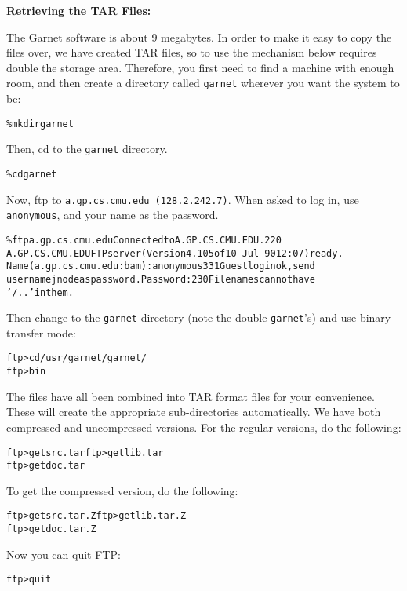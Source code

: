 \documentclass{report}
\newenvironment{programexample}{\begin{alltt}}{\end{alltt}}
\begin{document}
{\bf Retrieving the TAR Files:}

The Garnet software is about 9 megabytes.  In order to make it easy to
copy the files over, we have created TAR files, so to use the
mechanism below requires double the storage area.  Therefore, you
first need to find a machine with enough room, and then create a
directory called \texttt{garnet} wherever you want the system to be:
\begin{programexample}
  \% mkdir garnet
\end{programexample}

\newpage Then, cd to the \texttt{garnet} directory.
\begin{programexample}
  \% cd garnet
\end{programexample}
Now, ftp to \texttt{a.gp.cs.cmu.edu (128.2.242.7)}.  When asked to log in,
use \texttt{anonymous}, and your name as the password.
\begin{programexample}
  \% ftp a.gp.cs.cmu.edu Connected to A.GP.CS.CMU.EDU.  220
  A.GP.CS.CMU.EDU FTP server (Version 4.105 of 10-Jul-90 12:07) ready.
  Name (a.gp.cs.cmu.edu:bam): anonymous 331 Guest login ok, send
  usernamejnode as password.  Password: 230 Filenames can not have
  '/..' in them.
\end{programexample}

Then change to the \texttt{garnet} directory (note the double
\texttt{garnet}'s) and use binary transfer mode:
\begin{programexample}
  ftp> cd /usr/garnet/garnet/ 
  ftp> bin
\end{programexample}

The files have all been combined into TAR format files for your
convenience.  These will create the appropriate sub-directories
automatically.  We have both compressed and uncompressed versions.
For the regular versions, do the following:
\begin{programexample}
  ftp> get src.tar ftp> get lib.tar
  ftp> get doc.tar
\end{programexample}

To get the compressed version, do the following:
\begin{programexample}
  ftp> get src.tar.Z ftp> get lib.tar.Z
  ftp> get doc.tar.Z
\end{programexample}

Now you can quit FTP:
\begin{programexample}
  ftp> quit
\end{programexample}
\end{document}
